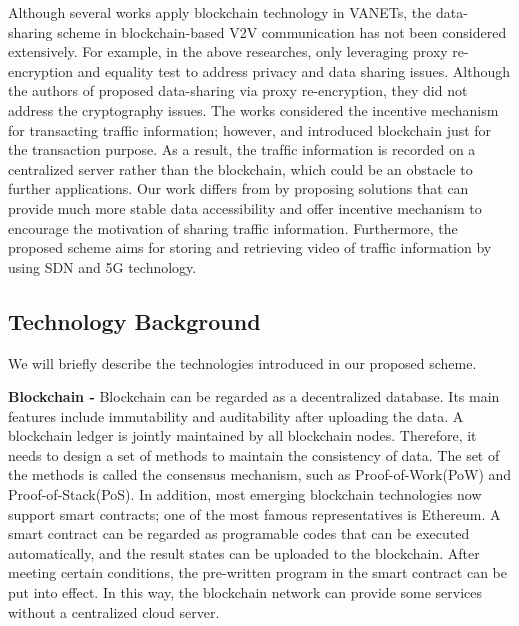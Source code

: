 \documentclass[journal,10pt]{IEEEtran}
\begin{document}
Although several works apply blockchain technology in VANETs, the data-sharing scheme in blockchain-based V2V communication has not been considered extensively.
For example, in the above researches, only \cite{BPREET} leveraging proxy re-encryption and equality test to address privacy and data sharing issues. Although the authors of \cite{Blockchain-enabled security in electric vehicles cloud and edge computing} proposed data-sharing via proxy re-encryption, they did not address the cryptography issues. The works \cite{Creditcoin: A privacy-preserving blockchain-based incentive announcement network for communications of smart vehicles}\cite{BPREET}\cite{Blockchain-enabled security in electric vehicles cloud and edge computing} considered the incentive mechanism for transacting traffic information; however, \cite{Creditcoin: A privacy-preserving blockchain-based incentive announcement network for communications of smart vehicles} and \cite{Blockchain-enabled security in electric vehicles cloud and edge computing} introduced blockchain just for the transaction purpose.  As a result, the trafﬁc information is recorded on a centralized server rather than the blockchain, which could be an obstacle to further applications. Our work differs from \cite{BPREET} by proposing solutions that can provide much more stable data accessibility and offer incentive mechanism to encourage the motivation of sharing traffic information. Furthermore, the proposed scheme aims for storing and retrieving video of traffic information by using SDN and 5G technology.

\subsection{Technology Background}
We will briefly describe the technologies introduced in our proposed scheme.

\textbf{Blockchain -}
Blockchain can be regarded as a decentralized database. Its main features include immutability and auditability after uploading the data. A blockchain ledger is jointly maintained by all blockchain nodes.
Therefore, it needs to design a set of methods to maintain the consistency of data. The set of the methods is called the consensus mechanism, such as Proof-of-Work(PoW) and Proof-of-Stack(PoS). In addition, most emerging blockchain technologies now support smart contracts; one of the most famous representatives is Ethereum. A smart contract can be regarded as programable codes that can be executed automatically, and the result states can be uploaded to the blockchain. After meeting certain conditions, the pre-written program in the smart contract can be put into effect. In this way, the blockchain network can provide some services without a centralized cloud server.
\end{document}
